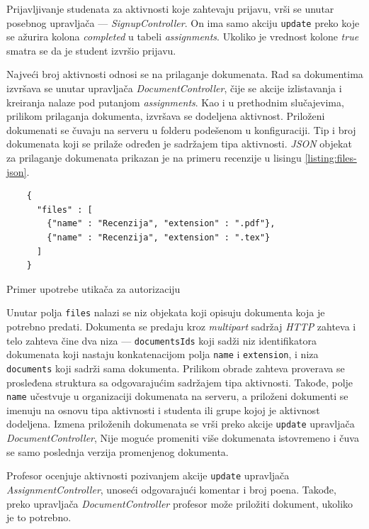 \documentclass[12pt,oneside]{memoir}
\begin{document}
Prijavljivanje studenata za aktivnosti koje zahtevaju prijavu, vrši se unutar posebnog upravljača --- \emph{SignupController}.
On ima samo akciju \texttt{update} preko koje se ažurira kolona \emph{completed} u tabeli \emph{assignments}.
Ukoliko je vrednost kolone \emph{true} smatra se da je student izvršio prijavu.

Najveći broj aktivnosti odnosi se na prilaganje dokumenata. Rad sa dokumentima izvršava se unutar upravljača \emph{DocumentController},
čije se akcije izlistavanja i kreiranja nalaze pod putanjom \emph{assignments}. Kao i u prethodnim slučajevima, prilikom prilaganja dokumenta,
izvršava se dodeljena aktivnost. Priloženi dokumenati se čuvaju na serveru u folderu podešenom u konfiguraciji.
Tip i broj dokumenata koji se prilaže određen je sadržajem tipa aktivnosti. \emph{JSON} objekat za prilaganje dokumenata prikazan je
na primeru recenzije u lisingu \ref{listing:files-json}. 
\begin{listing}[h!]
\begin{verbatim}
    {
      "files" : [
        {"name" : "Recenzija", "extension" : ".pdf"},
        {"name" : "Recenzija", "extension" : ".tex"}
      ]
    }
\end{verbatim}
\caption{Primer upotrebe utikača za autorizaciju}
\label{listing:files-json}
\end{listing}
Unutar polja \texttt{files} nalazi se niz objekata koji opisuju dokumenta koja je potrebno predati.
Dokumenta se predaju kroz \emph{multipart} sadržaj \emph{HTTP} zahteva i telo zahteva čine dva niza ---
\texttt{documentsIds} koji sadži niz identifikatora dokumenata koji nastaju konkatenacijom polja
\texttt{name} i \texttt{extension}, i niza \texttt{documents} koji sadrži sama dokumenta.
Prilikom obrade zahteva proverava se prosleđena struktura sa odgovarajućim sadržajem tipa aktivnosti.
Takođe, polje \texttt{name} učestvuje u organizaciji dokumenata na serveru, a priloženi dokumenti se
imenuju na osnovu tipa aktivnosti i studenta ili grupe kojoj je aktivnost dodeljena.
Izmena priloženih dokumenata se vrši preko akcije \texttt{update} upravljača \emph{DocumentController},
Nije moguće promeniti više dokumenata istovremeno i čuva se samo poslednja verzija promenjenog dokumenta.

Profesor ocenjuje aktivnosti pozivanjem akcije \texttt{update} upravljača \emph{AssignmentController},
unoseći odgovarajući komentar i broj poena. Takođe, preko upravljača \emph{DocumentController} profesor može
priložiti dokument, ukoliko je to potrebno.  
\end{document}

